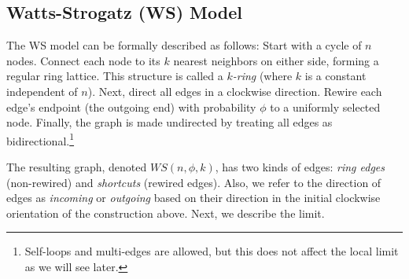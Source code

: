 \documentclass[10pt]{amsart}
\begin{document}
\subsection{Watts-Strogatz (WS) Model} \label{ws-process}

The WS model \cite{watts} can be formally described as follows: Start with a cycle of \(n\) nodes. Connect each node to its \(k\) nearest neighbors on either side, forming a regular ring lattice. This structure is called a \textit{\(k\)-ring} (where \(k\) is a constant independent of \(n\)). Next, direct all edges in a clockwise direction. Rewire each edge's endpoint (the outgoing end) with probability $\phi$ to a uniformly selected node. Finally, the graph is made undirected by treating all edges as bidirectional.\footnote{Self-loops and multi-edges are allowed, but this does not affect the local limit as we will see later.}

The resulting graph, denoted $WS(n,\phi,k)$, has two kinds of edges: \emph{ring edges} (non-rewired) and \emph{shortcuts} (rewired edges). Also, we refer to the direction of edges as \textit{incoming} or \textit{outgoing} based on their direction in the initial clockwise orientation of the construction above.  Next, we describe the limit.
\end{document}
